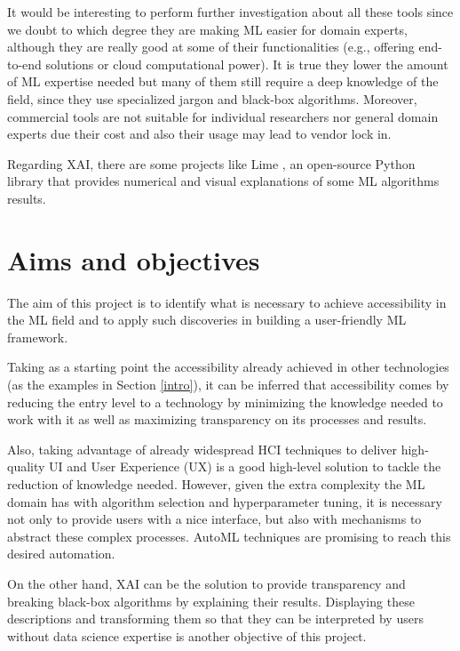\documentclass[runningheads]{llncs}
\begin{document}
	It would be interesting to perform further investigation about all these tools since we doubt to which
	degree they are making ML easier for domain experts, although they are really good at some of their
	functionalities (e.g., offering end-to-end solutions or cloud computational power). It is true they
	lower the amount of ML expertise needed but many of them still require a deep knowledge of the field,
	since they use specialized jargon and black-box algorithms. Moreover, commercial
	tools are not suitable for individual researchers nor general domain experts due their cost
	\cite{pennAI} and also their usage may lead to vendor lock in. 
	
	Regarding XAI, there are some projects like Lime \cite{lime}, an open-source Python library that 
	provides numerical and visual explanations of some ML algorithms results.
	
	\section{Aims and objectives}
	
	The aim of this project is to identify what is necessary to achieve accessibility in the ML field and to
	apply such discoveries in building a user-friendly ML framework.
	
	Taking as a starting point the accessibility already achieved in other technologies (as the examples in
	Section \ref{intro}), it can be inferred that accessibility comes by reducing the entry level to a
	technology by minimizing the knowledge needed to work with it as well as maximizing transparency on
	its processes and results. 
	
	Also, taking advantage of already widespread HCI techniques to deliver high-quality UI and User
	Experience (UX) is a good high-level solution to tackle the reduction of knowledge needed.  However,
	given the extra complexity the ML domain has with algorithm selection and hyperparameter tuning, it is
	necessary not only to provide users with a nice interface, but also with mechanisms to abstract these
	complex processes. AutoML techniques are promising to reach this desired automation.

	On the other hand, XAI can be the solution to provide transparency and breaking black-box algorithms by explaining their results. 
	Displaying these descriptions and transforming them so that they can be interpreted by users
	 without data science expertise is another objective of this project. 
\end{document}
